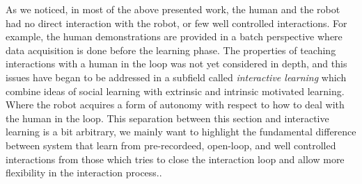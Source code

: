 As we noticed, in most of the above presented work, the human and the robot had no direct interaction with the robot, or few well controlled interactions. For example, the human demonstrations are provided in a batch perspective where data acquisition is done
before the learning phase. The properties of teaching interactions with a human in the loop was not yet considered in depth, and this issues have began to be addressed in a subfield called \emph{interactive learning}  which combine ideas of social learning with extrinsic and intrinsic motivated learning. Where the robot acquires a form of autonomy with respect to how to deal with the human in the loop. This separation between this section and interactive learning is a bit arbitrary, we mainly want to highlight the fundamental difference between system that learn from pre-recordeed, open-loop, and  well controlled interactions from those which tries to close the interaction loop and allow more flexibility in the interaction process..









